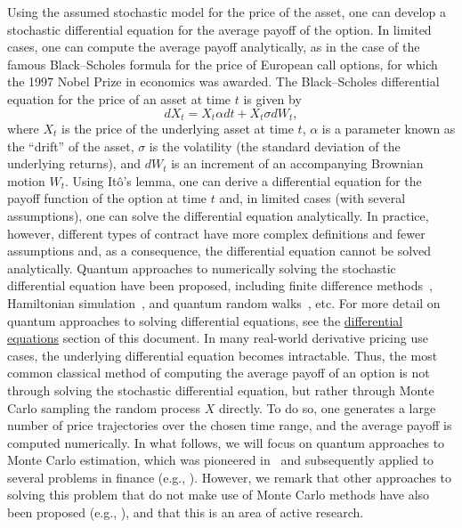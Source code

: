 \begin{refsection}
Using the assumed stochastic model for the price of the asset, one can develop a stochastic differential equation for the average payoff of the option. In limited cases, one can compute the average payoff analytically, as in the case of the famous Black--Scholes formula for the price of European call options, for which the 1997 Nobel Prize in economics was awarded. The Black--Scholes differential equation for the price of an asset at time $t$ is given by
\begin{equation}
d X_t = X_t \alpha dt + X_t \sigma d W_t,
\end{equation}
where $X_t$ is the price of the underlying asset at time $t$, $\alpha$ is a parameter known as the ``drift'' of the asset, $\sigma$ is the volatility (the standard deviation of the underlying returns), and $d W_t$ is an increment of an accompanying Brownian motion $W_t$. Using It\^o's lemma, one can derive a differential equation for the payoff function of the option at time $t$ and, in limited cases (with several assumptions), one can solve the differential equation analytically. In practice, however, different types of contract have more complex definitions and fewer assumptions and, as a consequence, the differential equation cannot be solved analytically. Quantum approaches to numerically solving the stochastic differential equation have been proposed, including finite difference methods~\cite{miyamoto2021pricing}, Hamiltonian simulation~\cite{gonzalez2021simulating}, and quantum random walks~\cite{linden2022quantum}, etc. For more detail on quantum approaches to solving differential equations, see the \hyperref[appl:DiffEq]{differential equations} section of this document. In many real-world derivative pricing use cases, the underlying differential equation becomes intractable. Thus, the most common classical method of computing the average payoff of an option is not through solving the stochastic differential equation, but rather through Monte Carlo sampling the random process $X$ directly. To do so, one generates a large number of price trajectories over the chosen time range, and the average payoff is computed numerically. In what follows, we will focus on quantum approaches to Monte Carlo estimation, which was pioneered in~\cite{montanaro2015QMonteCarlo} and subsequently applied to several problems in finance (e.g., \cite{rebentrost2018MonteCarloDerivatives,stamatopoulos2020option,stamatopoulos2022towards,han2022quantum,woerner2019quantum}).
However, we remark that other approaches to solving this problem that do not make use of Monte Carlo methods have also been proposed (e.g., \cite{rebentrost2022QuantumFinanceMartingalePrediction}), and that this is an area of active research.



\end{refsection}

